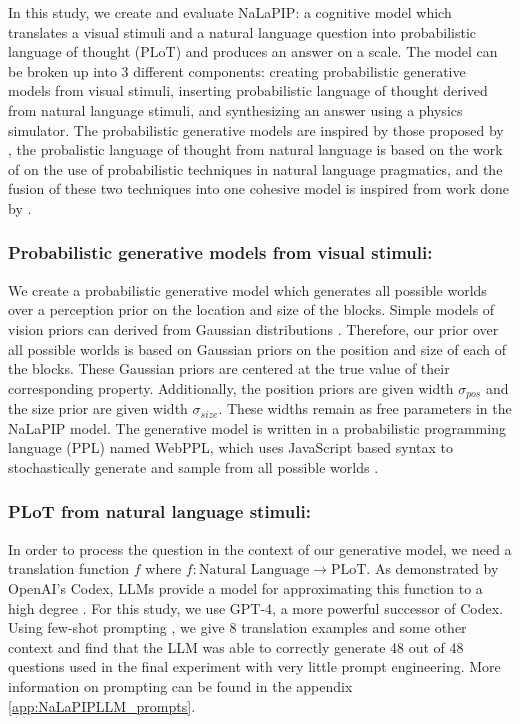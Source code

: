 \documentclass[10pt,letterpaper]{article}
\begin{document}
In this study, we create and evaluate NaLaPIP: a cognitive model which translates a visual stimuli and a natural language question into probabilistic language of thought (PLoT) \cite{goodman2014concepts} and produces an answer on a  scale. The model can be broken up into 3 different components: creating probabilistic generative models from visual stimuli, inserting probabilistic language of thought derived from natural language stimuli, and synthesizing an answer using a physics simulator. The probabilistic generative models are inspired by those proposed by , the probalistic language of thought from natural language is based on the work of  on the use of probabilistic techniques in natural language pragmatics, and the fusion of these two techniques into one cohesive model is inspired from work done by . 

\subsubsection{Probabilistic generative models from visual stimuli:} We create a probabilistic generative model which generates all possible worlds over a perception prior on the location and size of the blocks. Simple models of vision priors can derived from Gaussian distributions \cite{mamassian2002bayesian, series2013learning}. Therefore, our prior over all possible worlds is based on Gaussian priors on the position and size of each of the blocks. These Gaussian priors are centered at the true value of their corresponding property. Additionally, the position priors are given width $\sigma_{pos}$ and the size prior are given width $\sigma_{size}$. These widths remain as free parameters in the NaLaPIP model. 
The generative model is written in a probabilistic programming language (PPL) named WebPPL, which uses JavaScript based syntax to stochastically generate and sample from all possible worlds \cite{dippl}. 

\subsubsection{PLoT from natural language stimuli:} In order to process the question in the context of our generative model, we need a translation function $f$ where $f: \text{Natural Language} \to \text{PLoT}$. As demonstrated by OpenAI's Codex, LLMs provide a model for approximating this function to a high degree \cite{2107.03374}. For this study, we use GPT-4, a more powerful successor of Codex. Using few-shot prompting \cite{brown2020language}, we give 8 translation examples and some other context and find that the LLM was able to correctly generate 48 out of 48 questions used in the final experiment with very little prompt engineering. More information on prompting can be found in the appendix \autoref{app:NaLaPIPLLM_prompts}. 
\end{document}
